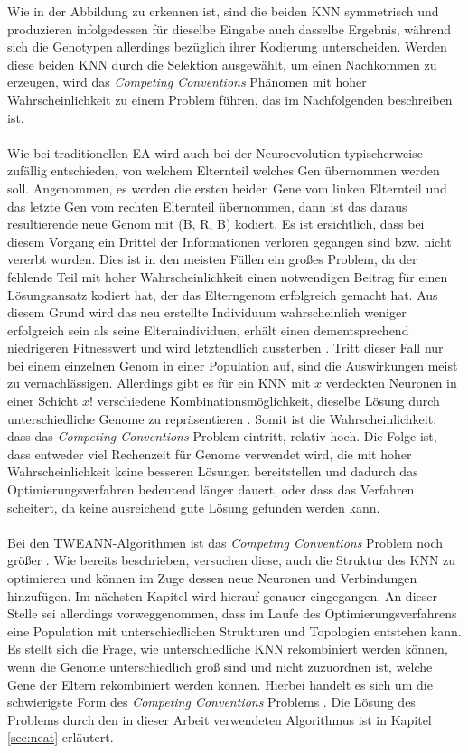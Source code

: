 Wie in der Abbildung zu erkennen ist, sind die beiden \ac{KNN} symmetrisch und produzieren infolgedessen für dieselbe Eingabe auch dasselbe Ergebnis, während sich die Genotypen allerdings bezüglich ihrer Kodierung unterscheiden. Werden diese beiden \ac{KNN} durch die Selektion ausgewählt, um einen Nachkommen zu erzeugen, wird das \emph{Competing Conventions} Phänomen mit hoher Wahrscheinlichkeit zu einem Problem führen, das im Nachfolgenden beschreiben ist. 
\\\\
Wie bei traditionellen \ac{EA} wird auch bei der Neuroevolution typischerweise zufällig entschieden, von welchem Elternteil welches Gen übernommen werden soll. Angenommen, es werden die ersten beiden Gene vom linken Elternteil und das letzte Gen vom rechten Elternteil übernommen, dann ist das daraus resultierende neue Genom mit (B, R, B) kodiert. Es ist ersichtlich, dass bei diesem Vorgang ein Drittel der Informationen verloren gegangen sind bzw. nicht vererbt wurden. Dies ist in den meisten Fällen ein großes Problem, da der fehlende Teil mit hoher Wahrscheinlichkeit einen notwendigen Beitrag für einen Lösungsansatz kodiert hat, der das Elterngenom erfolgreich gemacht hat. Aus diesem Grund wird das neu erstellte Individuum wahrscheinlich weniger erfolgreich sein als seine Elternindividuen, erhält einen dementsprechend niedrigeren Fitnesswert und wird letztendlich aussterben \cite{stanley2002evolving}. Tritt dieser Fall nur bei einem einzelnen Genom in einer Population auf, sind die Auswirkungen meist zu vernachlässigen. Allerdings gibt es für ein \ac{KNN} mit $x$ verdeckten Neuronen in einer Schicht $x!$ verschiedene Kombinationsmöglichkeit, dieselbe Lösung durch unterschiedliche Genome zu repräsentieren \cite{stanley2002evolving}. Somit ist die Wahrscheinlichkeit, dass das \emph{Competing Conventions} Problem eintritt, relativ hoch. Die Folge ist, dass entweder viel Rechenzeit für Genome verwendet wird, die mit hoher Wahrscheinlichkeit keine besseren Lösungen bereitstellen und dadurch das Optimierungsverfahren bedeutend länger dauert, oder dass das Verfahren scheitert, da keine ausreichend gute Lösung gefunden werden kann. 
\\\\
Bei den \ac{TWEANN}-Algorithmen ist das \emph{Competing Conventions} Problem noch größer \cite{stanley2002evolving}. Wie bereits beschrieben, versuchen diese, auch die Struktur des \ac{KNN} zu optimieren und können im Zuge dessen neue Neuronen und Verbindungen hinzufügen. Im nächsten Kapitel wird hierauf genauer eingegangen. An dieser Stelle sei allerdings vorweggenommen, dass im Laufe des Optimierungsverfahrens eine Population mit unterschiedlichen Strukturen und Topologien entstehen kann. Es stellt sich die Frage, wie  unterschiedliche \ac{KNN} rekombiniert werden können, wenn die Genome unterschiedlich groß sind und nicht zuzuordnen ist, welche Gene der Eltern rekombiniert werden können. Hierbei handelt es sich um die schwierigste Form des \emph{Competing Conventions} Problems \cite{stanley2002evolving}. Die Lösung des Problems durch den in dieser Arbeit verwendeten Algorithmus ist in Kapitel \ref{sec:neat} erläutert.

